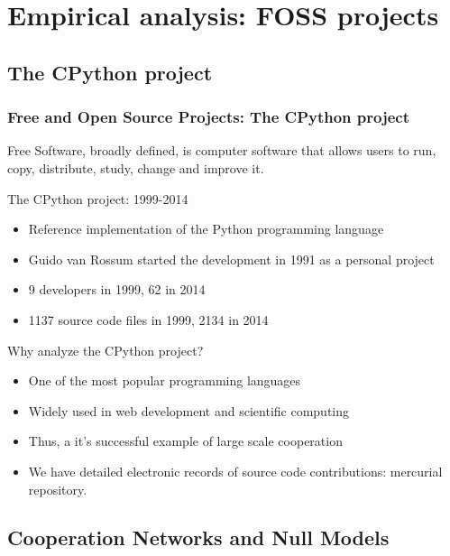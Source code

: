 \documentclass[ignorenonframetext,red,8pt,notes=hide]{beamer}
\begin{document}
\section{Empirical analysis: FOSS projects}

\subsection{The CPython project}

\begin{frame}
\frametitle{Free and Open Source Projects: The CPython project}

Free Software, broadly defined, is computer software that allows users to run, copy, distribute, study, change and improve it.

\begin{block}{The CPython project: 1999-2014}
\begin{itemize}
\item Reference implementation of the Python programming language
\item Guido van Rossum started the development in 1991 as a personal project
\item 9 developers in 1999, 62 in 2014
\item 1137 source code files in 1999, 2134 in 2014
\end{itemize}
\end{block}

\pause

\begin{block}{Why analyze the CPython project?}
\begin{itemize}
\item One of the most popular programming languages
\item Widely used in web development and scientific computing
\item Thus, a it's successful example of large scale cooperation
\item We have detailed electronic records of source code contributions: mercurial repository.
\end{itemize}
\end{block}

\end{frame}

\subsection{Cooperation Networks and Null Models}
\end{document}
